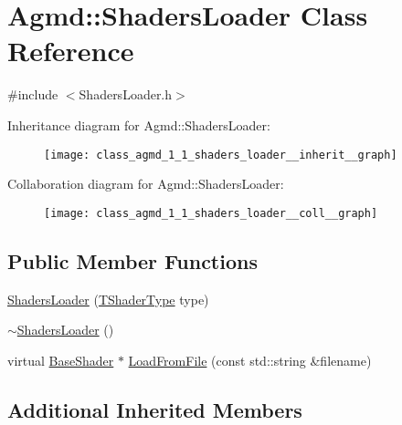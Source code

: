 \hypertarget{class_agmd_1_1_shaders_loader}{\section{Agmd\+:\+:Shaders\+Loader Class Reference}
\label{class_agmd_1_1_shaders_loader}
}


{\ttfamily \#include $<$Shaders\+Loader.\+h$>$}



Inheritance diagram for Agmd\+:\+:Shaders\+Loader\+:\nopagebreak
\begin{figure}[H]
\begin{center}
\leavevmode
\texttt{[image: class\_agmd\_1\_1\_shaders\_loader\_\_inherit\_\_graph]}
\end{center}
\end{figure}


Collaboration diagram for Agmd\+:\+:Shaders\+Loader\+:\nopagebreak
\begin{figure}[H]
\begin{center}
\leavevmode
\texttt{[image: class\_agmd\_1\_1\_shaders\_loader\_\_coll\_\_graph]}
\end{center}
\end{figure}
\subsection*{Public Member Functions}
\begin{DoxyCompactItemize}
\item 
\hyperlink{class_agmd_1_1_shaders_loader_af2a02b0656a724e2f43e2d81649fe9e0}{Shaders\+Loader} (\hyperlink{namespace_agmd_a162a493eaff1589f07a505806e6724b4}{T\+Shader\+Type} type)
\item 
\hyperlink{class_agmd_1_1_shaders_loader_acc6430db70d2cd46f47df119a1521f79}{$\sim$\+Shaders\+Loader} ()
\item 
virtual \hyperlink{class_agmd_1_1_base_shader}{Base\+Shader} $\ast$ \hyperlink{class_agmd_1_1_shaders_loader_a0a75b8e31b200efb7e64f65d4ce773f3}{Load\+From\+File} (const std\+::string \&filename)
\end{DoxyCompactItemize}
\subsection*{Additional Inherited Members}


